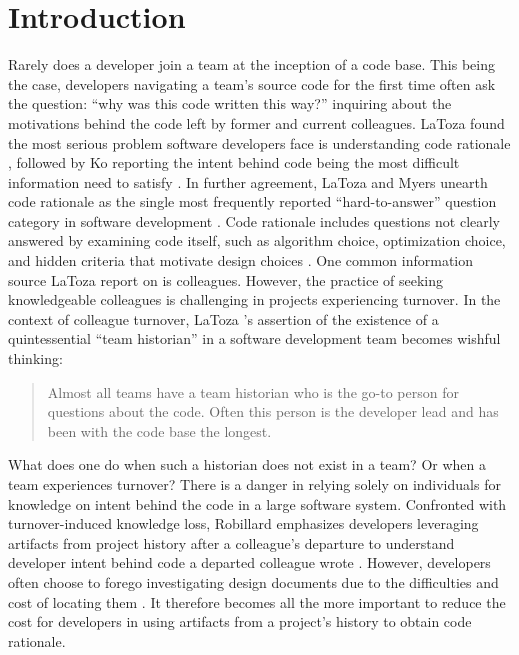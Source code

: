 
\chapter{Introduction}
\label{ch:Introduction}


Rarely does a developer join a team at the inception of a code base. 
This being the case, developers navigating a team's source code for the first time often ask the question: ``why was this code written this way?'' inquiring about the motivations behind the code left by former and current colleagues.
LaToza \etal found the most serious problem software developers face is understanding code rationale \cite{latoza_maintaining_2006}, followed by Ko \etal reporting the intent behind code being the most difficult information need to satisfy \cite{ko_information_2007}. 
In further agreement, LaToza and Myers unearth code rationale as the single most frequently reported “hard-to-answer” question category in software development \cite{latoza_hard-answer_2010}. 
Code rationale includes questions not clearly answered by examining code itself, such as algorithm choice, optimization choice, and hidden criteria that motivate design choices \cite{latoza_hard-answer_2010}. 
One common information source LaToza \etal report on is colleagues. 
However, the practice of seeking knowledgeable colleagues is challenging in projects experiencing turnover. 
In the context of colleague turnover, LaToza \etal 's assertion of the existence of a quintessential ``team historian'' in a software development team \cite{latoza_maintaining_2006} becomes wishful thinking:

\begin{quote}
Almost all teams have a team historian who is the go-to person for questions about the
code. Often this person is the developer lead and has been with the code base the longest.
\end{quote}

What does one do when such a historian does not exist in a team? Or when a team experiences turnover?
There is a danger in relying solely on individuals for knowledge on intent behind the code in a large software system.
Confronted with turnover-induced knowledge loss, Robillard emphasizes developers leveraging artifacts from project history after a colleague’s departure to understand developer intent behind code a departed colleague wrote \cite{robillard_turnover-induced_2021}. 
However, developers often choose to forego investigating design documents due to the difficulties and cost of locating them \cite{latoza_maintaining_2006}.
It therefore becomes all the more important to reduce the cost for developers in using artifacts from a project's history to obtain code rationale. 

